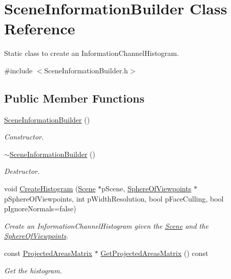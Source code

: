 \hypertarget{class_scene_information_builder}{\section{Scene\+Information\+Builder Class Reference}
\label{class_scene_information_builder}
}


Static class to create an Information\+Channel\+Histogram.  




{\ttfamily \#include $<$Scene\+Information\+Builder.\+h$>$}

\subsection*{Public Member Functions}
\begin{DoxyCompactItemize}
\item 
\hyperlink{class_scene_information_builder_a2346ab9193dc0a20fb508dd2bcaa6878}{Scene\+Information\+Builder} ()
\begin{DoxyCompactList}\small\item\em Constructor. \end{DoxyCompactList}\item 
\hyperlink{class_scene_information_builder_a33d0b07a7cde397fec6095f298cd6fd2}{$\sim$\+Scene\+Information\+Builder} ()
\begin{DoxyCompactList}\small\item\em Destructor. \end{DoxyCompactList}\item 
void \hyperlink{class_scene_information_builder_a1fcdef9ce0a7d98c4966be8e7116286d}{Create\+Histogram} (\hyperlink{class_scene}{Scene} $\ast$p\+Scene, \hyperlink{class_sphere_of_viewpoints}{Sphere\+Of\+Viewpoints} $\ast$p\+Sphere\+Of\+Viewpoints, int p\+Width\+Resolution, bool p\+Face\+Culling, bool p\+Ignore\+Normals=false)
\begin{DoxyCompactList}\small\item\em Create an Information\+Channel\+Histogram given the \hyperlink{class_scene}{Scene} and the \hyperlink{class_sphere_of_viewpoints}{Sphere\+Of\+Viewpoints}. \end{DoxyCompactList}\item 
const \hyperlink{class_projected_areas_matrix}{Projected\+Areas\+Matrix} $\ast$ \hyperlink{class_scene_information_builder_a170c3ecfa87ff2ec199fc96822621c40}{Get\+Projected\+Areas\+Matrix} () const 
\begin{DoxyCompactList}\small\item\em Get the histogram. \end{DoxyCompactList}\item 

\end{DoxyCompactItemize}
